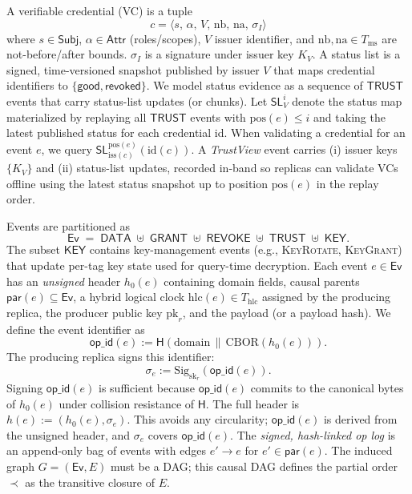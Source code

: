 \documentclass[10pt,journal,compsoc]{IEEEtran}
\begin{document}
A verifiable credential (VC) is a tuple
\[
  c = \langle s,\, \alpha,\, V,\, \mathrm{nb},\, \mathrm{na},\, \sigma_I\rangle
\]
where $s\!\in\!\mathsf{Subj}$, $\alpha\!\in\!\mathsf{Attr}$ (roles/scopes), $V$ issuer identifier,
and $\mathrm{nb},\mathrm{na}\!\in\!T_{\mathrm{ms}}$ are not-before/after bounds.
$\sigma_I$ is a signature under issuer key $K_V$.
A status list is a signed, time-versioned snapshot published by issuer $V$ that maps credential identifiers to $\{\mathsf{good},\mathsf{revoked}\}$.
We model status evidence as a sequence of $\mathsf{TRUST}$ events that carry status-list updates (or chunks).
Let $\mathsf{SL}^{i}_{V}$ denote the status map materialized by replaying all $\mathsf{TRUST}$ events with $\mathrm{pos}(e) \le i$ and taking the latest published status for each credential id.
When validating a credential for an event $e$, we query $\mathsf{SL}^{\mathrm{pos}(e)}_{\mathrm{iss}(c)}(\mathrm{id}(c))$.
A \emph{TrustView} event carries (i) issuer keys $\{K_V\}$ and (ii) status-list updates, recorded in-band so replicas can validate VCs offline using the latest status snapshot up to position $\mathrm{pos}(e)$ in the replay order.



Events are partitioned as
\[
  \mathsf{Ev} \;=\; \mathsf{DATA}\;\uplus\;\mathsf{GRANT}\;\uplus\;\mathsf{REVOKE}\;\uplus\;\mathsf{TRUST}\;\uplus\;\mathsf{KEY}.
\]
The subset $\mathsf{KEY}$ contains key-management events (e.g., \textsc{KeyRotate}, \textsc{KeyGrant}) that update per-tag key state used for query-time decryption.
Each event $e\in\mathsf{Ev}$ has an \emph{unsigned} header $h_0(e)$ containing domain fields, causal parents $\mathsf{par}(e)\subseteq\mathsf{Ev}$, a hybrid logical clock $\mathrm{hlc}(e)\in T_{\mathrm{hlc}}$ assigned by the producing replica, the producer public key $\mathrm{pk}_r$, and the payload (or a payload hash). We define the event identifier as
\[
  \mathsf{op\_id}(e) := \mathsf{H}(\mathrm{domain}\,\|\,\mathrm{CBOR}(h_0(e))).
\]
The producing replica signs this identifier:
\[
  \sigma_e := \mathrm{Sig}_{\mathrm{sk}_r}(\mathsf{op\_id}(e)).
\]
Signing $\mathsf{op\_id}(e)$ is sufficient because $\mathsf{op\_id}(e)$ commits to the canonical bytes of $h_0(e)$ under collision resistance of $\mathsf{H}$.
The full header is $h(e) := (h_0(e), \sigma_e)$. This avoids any circularity; $\mathsf{op\_id}(e)$ is derived from the unsigned header, and $\sigma_e$ covers $\mathsf{op\_id}(e)$.
The \emph{signed, hash-linked op log} is an append-only bag of events with edges $e'\!\to\! e$ for $e'\in\mathsf{par}(e)$.
The induced graph $G=(\mathsf{Ev},E)$ must be a DAG; this causal DAG defines the partial order $\prec$ as the transitive closure of $E$.
\end{document}
